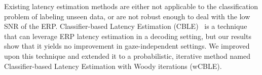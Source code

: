 Existing latency estimation methods are either not applicable to the
classification problem of labeling unseen data, or are not robust enough to
deal with the low SNR of the ERP.
Classifier-based Latency Estimation (CBLE)~\cite{Mowla2017} is a technique that can leverage
ERP latency estimation in a decoding setting, but our results show that it
yields no improvement in gaze-independent settings.
We improved upon this technique and extended it to a probabilistic, iterative
method named Classifier-based Latency Estimation with Woody iterations (wCBLE).

